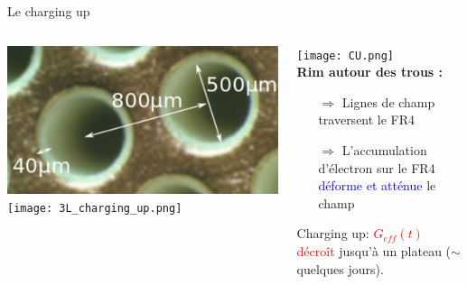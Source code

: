     \begin{frame}{Le charging up}
        \begin{scriptsize}
            \begin{columns}
      			\begin{column}{0.5\textwidth}
          			\includegraphics[width=\textwidth]{RIM.png}\\\vspace{1cm}
      				\texttt{[image: 3L\_charging\_up.png]}\\
      			\end{column}\hfill
      			\begin{column}{0.5\textwidth}
      				\texttt{[image: CU.png]}\\\vspace{1cm}
          			\textbf{Rim autour des trous :}
      				\begin{itemize}
      					\item[$\Rightarrow$] Lignes de champ traversent le FR4\\
      					\item[$\Rightarrow$] L'accumulation d'électron sur le FR4 \textcolor{blue}{déforme et atténue} le champ
      				\end{itemize}
      				Charging up: \textcolor{red}{$G_{eff}(t)$ décroît} jusqu'à un plateau ($\sim$ quelques jours).
      			\end{column}
      		\end{columns}
        \end{scriptsize}
    \end{frame}

